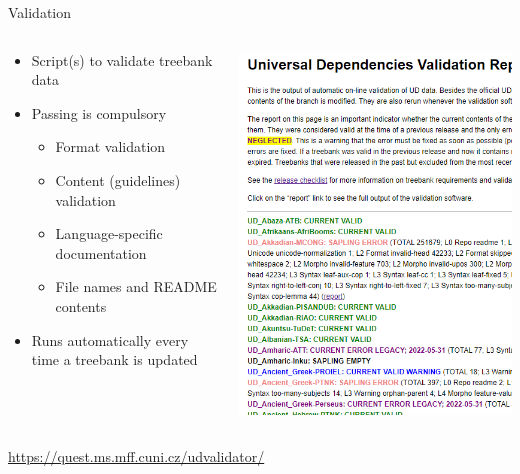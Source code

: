 \documentclass[10pt, compress, aspectratio=169]{beamer}
\newcommand{\nologo}{\setbeamertemplate{logo}{}}
\begin{document}
{\nologo\begin{frame}{Validation}
  \begin{columns}[T] %
    \begin{column}{.6\textwidth}
      \begin{itemize}
        \item Script(s) to validate treebank data
        \item Passing is compulsory
          \begin{itemize}
            \item Format validation
            \item Content (guidelines) validation
            \item Language-specific documentation
            \item File names and README contents
          \end{itemize}
        \item Runs automatically every time a treebank is updated
      \end{itemize}
    \end{column}
    \begin{column}{.4\textwidth}
      \includegraphics[width=\textwidth]{images/validation.png}
    \end{column}
  \end{columns}
  \url{https://quest.ms.mff.cuni.cz/udvalidator/}
\end{frame}}
\end{document}
